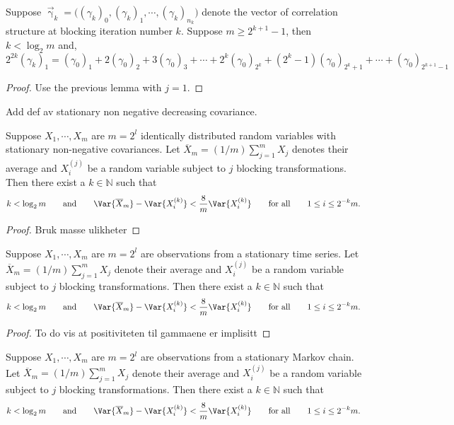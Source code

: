 \documentclass[11pt,english,a4paper]{article}
\begin{document}
\begin{prop}
Suppose $\vec{\upgamma}_k = \big((\gamma_k)_0 , (\gamma_k)_1, \cdots, (\gamma_k)_{n_k}\big)$ denote the vector of correlation structure at blocking iteration number $k$. Suppose $m \geq 2^{k+1} - 1$, then $k < \log_2 m$ and,
\[
2^{  2k}(\gamma_k)_1 = (\gamma_0)_1 + 2(\gamma_0)_2 + 3 (\gamma_0)_3 + \cdots +2^k(\gamma_0)_{2^k} + (2^k-1)(\gamma_0)_{2^k+1} + \cdots + (\gamma_0)_{2^{k+1}-1}
\]
\end{prop}
\begin{proof}
Use the previous lemma with $j=1$.
\end{proof}
Add def av stationary non negative decreasing covariance.
\begin{theorem}
Suppose $X_1,\cdots, X_m$ are $m = 2^l$ identically distributed random variables with stationary non-negative covariances. Let $\overline X_m = (1/m)\sum_{j=1}^m X_j$ denotes their average and $X^{(j)}_i$ be a random variable subject to $j$ blocking transformations. Then there exist a $k \in \mathbb{N}$ such that 
\[
k < \log_2 m \qquad \text{and} \qquad \Var{\overline X_m} - \Var{X^{(k)}_i} < \frac{8}{m}\Var{X^{(k)}_i} \qquad \text{for all} \qquad 1 \leq i \leq 2^{-k}m.
\]
\end{theorem}
\begin{proof}
Bruk masse ulikheter
\end{proof}

\begin{corollary}
Suppose $X_1,\cdots, X_m$ are $m = 2^l$ are observations from a stationary time series. Let $\overline X_m = (1/m)\sum_{j=1}^m X_j$ denote their average and $X^{(j)}_i$ be a random variable subject to $j$ blocking transformations. Then there exist a $k \in \mathbb{N}$ such that 
\[
k < \log_2 m \qquad \text{and} \qquad \Var{\overline X_m} - \Var{X^{(k)}_i} < \frac{8}{m}\Var{X^{(k)}_i} \qquad \text{for all} \qquad 1 \leq i \leq 2^{-k}m.
\]
\end{corollary}
\begin{proof}
To do vis at positiviteten til gammaene er implisitt
\end{proof}
\begin{corollary}
Suppose $X_1,\cdots, X_m$ are $m = 2^l$ are observations from a stationary Markov chain. Let $\overline X_m = (1/m)\sum_{j=1}^m X_j$ denote their average and $X^{(j)}_i$ be a random variable subject to $j$ blocking transformations. Then there exist a $k \in \mathbb{N}$ such that 
\[
k < \log_2 m \qquad \text{and} \qquad \Var{\overline X_m} - \Var{X^{(k)}_i} < \frac{8}{m}\Var{X^{(k)}_i} \qquad \text{for all} \qquad 1 \leq i \leq 2^{-k}m.
\]
\end{corollary}
\end{document}
